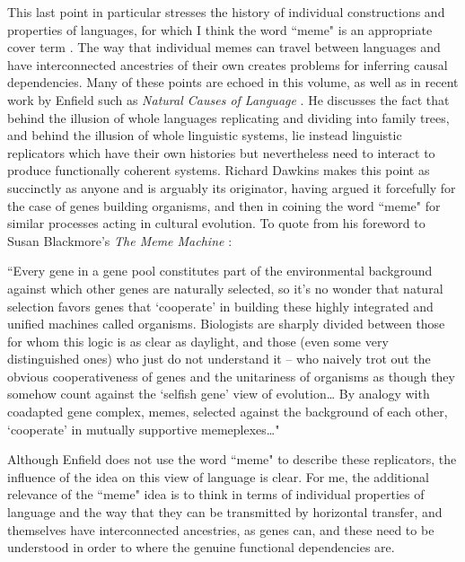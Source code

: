 \documentclass[output=paper]{langsci/langscibook}
\begin{document}
 This last point in particular stresses the history of individual constructions and properties of languages, for which I think the word ``meme" is an appropriate cover term \citep{Dawkins1976}. The way that individual memes can travel between languages and have interconnected ancestries of their own creates problems for inferring causal dependencies.  Many of these points are echoed in this volume, as well as in recent work by Enfield such as \textit{Natural Causes of Language }\citep{EnfieldNaturalCauses2014}.  He discusses the fact that behind the illusion of whole languages replicating and dividing into family trees, and behind the illusion of whole linguistic systems, lie instead linguistic replicators which have their own histories but nevertheless need to interact to produce functionally coherent systems. Richard Dawkins makes this point as succinctly as anyone and is arguably its originator, having argued it forcefully for the case of genes building organisms, and then in coining the word ``meme" for similar processes acting in cultural evolution.  To quote from his foreword to Susan Blackmore’s \textit{The Meme Machine }\citep{Blackmore1999}: 



``Every gene in a gene pool constitutes part of the environmental background against which other genes are naturally selected, so it’s no wonder that natural selection favors genes that ‘cooperate’ in building these highly integrated and unified machines called organisms.  Biologists are sharply divided between those for whom this logic is as clear as daylight, and those (even some very distinguished ones) who just do not understand it – who naively trot out the obvious cooperativeness of genes and the unitariness of organisms as though they somehow count against the ‘selfish gene’ view of evolution… By analogy with coadapted gene complex, memes, selected against the background of each other, ‘cooperate’ in mutually supportive memeplexes…"



Although Enfield does not use the word ``meme" to describe these replicators, the influence of the idea on this view of language is clear.  For me, the additional relevance of the ``meme" idea is to think in terms of individual properties of language and the way that they can be transmitted by horizontal transfer, and themselves have interconnected ancestries, as genes can, and these need to be understood in order to where the genuine functional dependencies are. 
\end{document}

